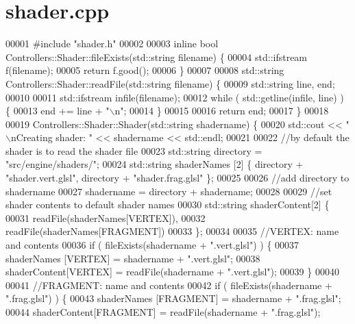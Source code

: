\section{shader.\+cpp}
\label{shader_8cpp_source}

\begin{DoxyCode}
00001 \textcolor{preprocessor}{#include "shader.h"}
00002 
00003 \textcolor{keyword}{inline} \textcolor{keywordtype}{bool} Controllers::Shader::fileExists(std::string filename) \{
00004     std::ifstream f(filename);
00005     \textcolor{keywordflow}{return} f.good();
00006 \}
00007 
00008 std::string Controllers::Shader::readFile(std::string filename) \{
00009     std::string line, end;
00010 
00011     std::ifstream infile(filename);
00012     \textcolor{keywordflow}{while} ( std::getline(infile, line) ) \{
00013         end += line + \textcolor{stringliteral}{"\(\backslash\)n"};
00014     \}
00015 
00016     \textcolor{keywordflow}{return} end;
00017 \}
00018 
00019 Controllers::Shader::Shader(std::string shadername) \{
00020     std::cout << \textcolor{stringliteral}{"\(\backslash\)nCreating shader: "} << shadername << std::endl;
00021 
00022     \textcolor{comment}{//by default the shader is to read the shader file}
00023     std::string directory        = \textcolor{stringliteral}{"src/engine/shaders/"};
00024     std::string shaderNames  [2] \{ directory + \textcolor{stringliteral}{"shader.vert.glsl"}, directory + \textcolor{stringliteral}{"shader.frag.glsl"} \};
00025     
00026     \textcolor{comment}{//add directory to shadername}
00027     shadername = directory + shadername;
00028 
00029     \textcolor{comment}{//set shader contents to default shader names}
00030     std::string shaderContent[2] \{ 
00031         readFile(shaderNames[VERTEX]),
00032         readFile(shaderNames[FRAGMENT])
00033     \};
00034 
00035     \textcolor{comment}{//VERTEX:   name and contents}
00036     \textcolor{keywordflow}{if} ( fileExists(shadername + \textcolor{stringliteral}{".vert.glsl"}) ) \{
00037         shaderNames  [VERTEX]   = shadername + \textcolor{stringliteral}{".vert.glsl"};
00038         shaderContent[VERTEX]   = readFile(shadername + \textcolor{stringliteral}{".vert.glsl"});
00039     \}
00040 
00041     \textcolor{comment}{//FRAGMENT: name and contents}
00042     \textcolor{keywordflow}{if} ( fileExists(shadername + \textcolor{stringliteral}{".frag.glsl"}) ) \{
00043         shaderNames  [FRAGMENT] = shadername + \textcolor{stringliteral}{".frag.glsl"};
00044         shaderContent[FRAGMENT] = readFile(shadername + \textcolor{stringliteral}{".frag.glsl"});

\end{DoxyCode}

